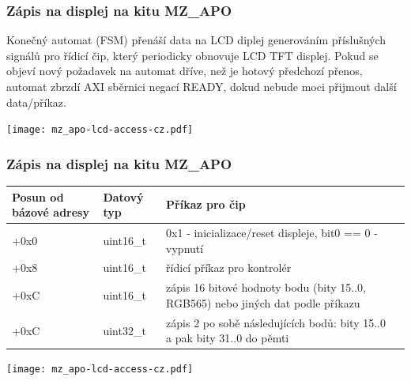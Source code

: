 \documentclass{beamer}
\begin{document}
\begin{frame}
\frametitle{Zápis na displej na kitu MZ\_APO}

Konečný automat (FSM) přenáší data na LCD diplej generováním příslušných signálů pro řídicí čip, který periodicky obnovuje LCD TFT displej.
Pokud se objeví nový požadavek na automat dříve, než je hotový předchozí přenos, automat zbrzdí AXI sběrnici negací READY, dokud nebude moci přijmout další data/příkaz.

\texttt{[image: mz\_apo-lcd-access-cz.pdf]}

\end{frame}

\begin{frame}
\frametitle{Zápis na displej na kitu MZ\_APO}

\begin{tabular}{|l|l|l|l|} \hline
Posun od bázové adresy & Datový typ & Příkaz pro čip \\\hline
+0x0 & uint16\_t & 0x1 - inicializace/reset displeje, bit0 == 0 - vypnutí \\\hline
+0x8 & uint16\_t & řídicí příkaz pro kontrolér \\\hline
+0xC & uint16\_t & zápis 16 bitové hodnoty bodu (bity 15..0, RGB565) nebo jiných dat podle příkazu \\\hline
+0xC & uint32\_t & zápis 2 po sobě následujících bodů: bity 15..0 a pak bity 31..0 do pěmti \\\hline
\end{tabular}

\vspace{5mm}

\texttt{[image: mz\_apo-lcd-access-cz.pdf]}

\end{frame}
\end{document}
